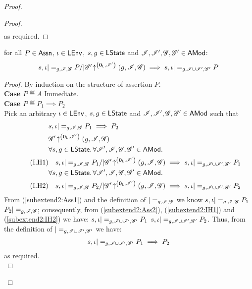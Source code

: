 \begin{lemma}
\begin{proof}
{\begin{lemma}[]
\begin{proof}
\begin{align*}
\end{align*}
%
as required.
\end{proof}
\end{lemma}
%
%
\begin{lemma}[]\label{lem:extend2}
for all $P \in \textsf{Assn}$, $\iota \in \textsf{LEnv}$, $s, g \in \textsf{LState}$ and $\mathscr{I}, \mathscr{I}', \mathscr{G}, \mathscr{G}' \in \textsf{AMod}$: 
% 
\[
\begin{array}{@{} l @{}}
	s, \lenv |=_{g, \lmod, \gmod} P /| 
	\expandsAM{\gmod'}{\unitL}{\lmod'}{g}{\lmod}{\gmod}
	 \implies  s, \lenv |=_{g, \lmod \cup \lmod', \gmod'} P
\end{array}
\]
%
\begin{proof}
By induction on the structure of assertion $P$.	\\

\noindent\textbf{Case $P \eqdef A$\quad} Immediate.\\
\noindent\textbf{Case $P \eqdef P_1 \implies P_2$} \\
Pick an arbitrary $\iota \in \textsf{LEnv}$, $s, g \in \textsf{LState}$ and $\mathscr{I}, \mathscr{I}', \mathscr{G}, \mathscr{G}' \in \textsf{AMod}$ such that
%
\begin{align}
	& s, \lenv |=_{g, \lmod, \gmod} P_1 \implies P_2 \label{subextend2:Ass1}\\
%	
	&\expandsAM{\gmod'}{\unitL}{\lmod'}{g}{\lmod}{\gmod} \label{subextend2:Ass2}\\
%	
	& \for{s, g \in \LStates} \for{\lmod', \lmod, \gmod, \gmod' \in \AMods} \nonumber\\
	\tag{I.H1} & 
	\quad s, \lenv |=_{g, \lmod, \gmod} P_1 /| \expandsAM{\gmod'}{\unitL}{\lmod'}{g}{\lmod}{\gmod} \implies s, \lenv |=_{g, \lmod \cup \lmod', \gmod'} P_1 \label{subextend2:IH1}\\ 
%
	& \for{s, g \in \LStates} \for{\lmod', \lmod, \gmod, \gmod' \in \AMods} \nonumber\\
	\tag{I.H2} & 
	\quad s, \lenv |=_{g, \lmod, \gmod} P_2 /| \expandsAM{\gmod'}{\unitL}{\lmod'}{g}{\lmod}{\gmod} \implies s, \lenv |=_{g, \lmod \cup \lmod', \gmod'} P_2 \label{subextend2:IH2}
%	
\end{align}
%
From (\ref{subextend2:Ass1}) and the definition of $|=_{g, \mathscr{I}, \mathscr{G}}$ we know $s, \iota |=_{g, \mathscr{I}, \mathscr{G}} P_1$  $P_2 |=_{g, \mathscr{I}, \mathscr{G}}$; consequently, from (\ref{subextend2:Ass2}), (\ref{subextend2:IH1}) and (\ref{subextend2:IH2}) we have: $s, \iota |=_{g, \mathscr{I} \cup \mathscr{I}', \mathscr{G}'} P_1$  $s, \iota |=_{g, \mathscr{I} \cup \mathscr{I}', \mathscr{G}'} P_2$. Thus, from the definition of $|=_{g, \mathscr{I} \cup \mathscr{I}', \mathscr{G}'}$ we have:
%
\begin{align*}
	s, \iota |=_{g, \mathscr{I} \cup \mathscr{I}', \mathscr{G}'} P_1 \implies P_2
\end{align*}
%
as required.\\


\end{proof}
\end{lemma}}
\end{proof}
\end{lemma}
